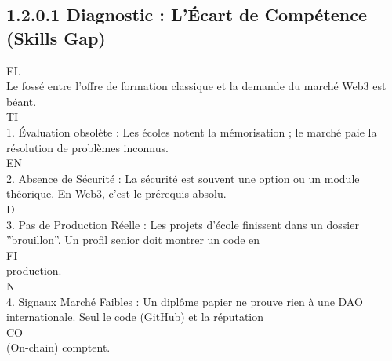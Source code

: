 \subsection{1.2.0.1 Diagnostic : L’Écart de Compétence (Skills Gap)}
\vspace{0.5em}
\vspace{0.5em}
\vspace{0.5em}
\vspace{0.5em}
EL\\
Le fossé entre l’offre de formation classique et la demande du marché Web3 est béant.\\
\vspace{0.5em}
\vspace{0.5em}
\vspace{0.5em}
\vspace{0.5em}
TI\\
1. Évaluation obsolète : Les écoles notent la mémorisation ; le marché paie la résolution de problèmes inconnus.\\
\vspace{0.5em}
\vspace{0.5em}
\vspace{0.5em}
\vspace{0.5em}
EN\\
2. Absence de Sécurité : La sécurité est souvent une option ou un module théorique. En Web3, c’est le prérequis absolu.\\
\vspace{0.5em}
\vspace{0.5em}
\vspace{0.5em}
\vspace{0.5em}
D\\
3. Pas de Production Réelle : Les projets d’école finissent dans un dossier ”brouillon”. Un profil senior doit montrer un code en\\
\vspace{0.5em}
\vspace{0.5em}
\vspace{0.5em}
\vspace{0.5em}
FI\\
production.\\
\vspace{0.5em}
\vspace{0.5em}
N\\
4. Signaux Marché Faibles : Un diplôme papier ne prouve rien à une DAO internationale. Seul le code (GitHub) et la réputation\\
CO\\
(On-chain) comptent.\\
\vspace{0.5em}
